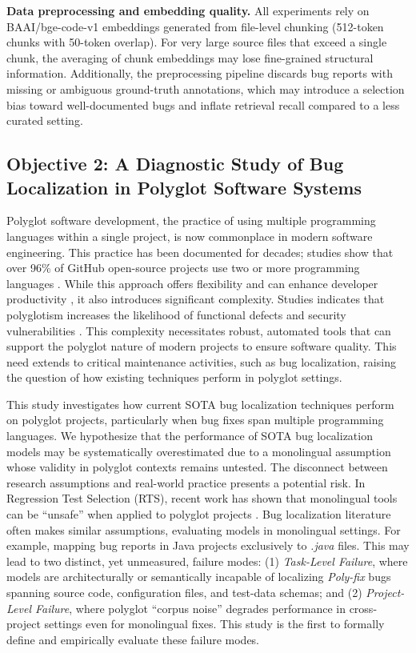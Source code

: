 \documentclass[12pt,table,xcdraw]{article}
\begin{document}
\textbf{Data preprocessing and embedding quality.} All experiments rely on BAAI/bge-code-v1 embeddings generated from file-level chunking (512-token chunks with 50-token overlap). For very large source files that exceed a single chunk, the averaging of chunk embeddings may lose fine-grained structural information. Additionally, the preprocessing pipeline discards bug reports with missing or ambiguous ground-truth annotations, which may introduce a selection bias toward well-documented bugs and inflate retrieval recall compared to a less curated setting.


\subsection{Objective 2: A Diagnostic Study of Bug Localization in Polyglot Software Systems}
Polyglot software development, the practice of using multiple programming languages within a single project, is now commonplace in modern software engineering. This practice has been documented for decades; studies show that over 96\% of GitHub open-source projects use two or more programming languages \cite{tomassetti2014empirical}. While this approach offers flexibility and can enhance developer productivity \cite{abidi2019behind}, it also introduces significant complexity. Studies indicates that polyglotism increases the likelihood of functional defects and security vulnerabilities \cite{yang2024multi,maurina2025babelrts}. This complexity necessitates robust, automated tools that can support the polyglot nature of modern projects to ensure software quality. This need extends to critical maintenance activities, such as bug localization, raising the question of how existing techniques perform in polyglot settings.

This study investigates how current SOTA bug localization techniques perform on polyglot projects, particularly when bug fixes span multiple programming languages. We hypothesize that the performance of SOTA bug localization models may be systematically overestimated due to a monolingual assumption whose validity in polyglot contexts remains untested. The disconnect between research assumptions and real-world practice presents a potential risk. In Regression Test Selection (RTS), recent work has shown that monolingual tools can be ``unsafe'' when applied to polyglot projects \cite{maurina2025babelrts}. Bug localization literature often makes similar assumptions, evaluating models in monolingual settings. For example, mapping bug reports in Java projects exclusively to \textit{.java} files. This may lead to two distinct, yet unmeasured, failure modes: (1) \textit{Task-Level Failure}, where models are architecturally or semantically incapable of localizing \textit{Poly-fix} bugs spanning source code, configuration files, and test-data schemas; and (2) \textit{Project-Level Failure}, where polyglot ``corpus noise'' degrades performance in cross-project settings even for monolingual fixes. This study is the first to formally define and empirically evaluate these failure modes.
\end{document}
